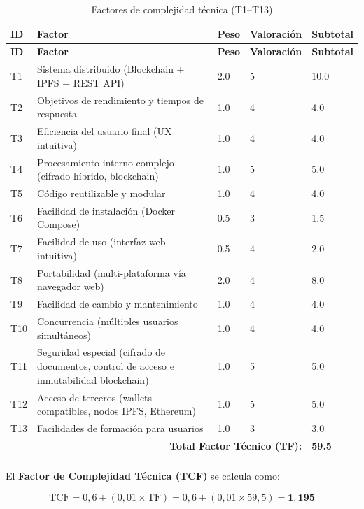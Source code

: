 \documentclass[11pt, a4paper]{article}
\begin{document}
\begin{longtable}{|p{0.8cm}|p{7.5cm}|p{1.3cm}|p{1.8cm}|p{2cm}|}
\hline
\textbf{ID} & \textbf{Factor} & \textbf{Peso} & \textbf{Valoración} & \textbf{Subtotal} \\
\hline
\endfirsthead
\hline
\textbf{ID} & \textbf{Factor} & \textbf{Peso} & \textbf{Valoración} & \textbf{Subtotal} \\
\hline
\endhead
T1 & Sistema distribuido (Blockchain + IPFS + REST API) & 2.0 & 5 & 10.0 \\
\hline
T2 & Objetivos de rendimiento y tiempos de respuesta & 1.0 & 4 & 4.0 \\
\hline
T3 & Eficiencia del usuario final (UX intuitiva) & 1.0 & 4 & 4.0 \\
\hline
T4 & Procesamiento interno complejo (cifrado híbrido, blockchain) & 1.0 & 5 & 5.0 \\
\hline
T5 & Código reutilizable y modular & 1.0 & 4 & 4.0 \\
\hline
T6 & Facilidad de instalación (Docker Compose) & 0.5 & 3 & 1.5 \\
\hline
T7 & Facilidad de uso (interfaz web intuitiva) & 0.5 & 4 & 2.0 \\
\hline
T8 & Portabilidad (multi-plataforma vía navegador web) & 2.0 & 4 & 8.0 \\
\hline
T9 & Facilidad de cambio y mantenimiento & 1.0 & 4 & 4.0 \\
\hline
T10 & Concurrencia (múltiples usuarios simultáneos) & 1.0 & 4 & 4.0 \\
\hline
T11 & Seguridad especial (cifrado de documentos, control de acceso e inmutabilidad blockchain) & 1.0 & 5 & 5.0 \\
\hline
T12 & Acceso de terceros (wallets compatibles, nodos IPFS, Ethereum) & 1.0 & 5 & 5.0 \\
\hline
T13 & Facilidades de formación para usuarios & 1.0 & 3 & 3.0 \\
\hline
\multicolumn{4}{|r|}{\textbf{Total Factor Técnico (TF):}} & \textbf{59.5} \\
\hline
\caption{Factores de complejidad técnica (T1--T13)}\label{tab:factores-tecnicos}
\end{longtable}

\vspace{0.5em}
\noindent El \textbf{Factor de Complejidad Técnica (TCF)} se calcula como:

\begin{equation}
\text{TCF} = 0{,}6 + (0{,}01 \times \text{TF}) = 0{,}6 + (0{,}01 \times 59{,}5) = \mathbf{1{,}195}
\end{equation}
\end{document}
